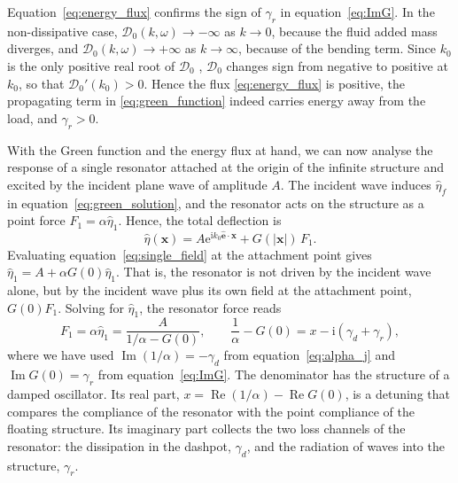 \begin{remark}
  Equation~\eqref{eq:energy_flux} confirms the sign of $\gamma_r$ in equation~\eqref{eq:ImG}. In the non-dissipative case, $\mathcal{D}_0(k,\omega)\to-\infty$ as $k\to0$, because the fluid added mass diverges, and $\mathcal{D}_0(k,\omega)\to+\infty$ as $k\to\infty$, because of the bending term. Since $k_0$ is the only positive real root of $\mathcal{D}_0$ \citep{fox1994oblique}, $\mathcal{D}_0$ changes sign from negative to positive at $k_0$, so that $\mathcal{D}_0'(k_0)>0$. Hence the flux \eqref{eq:energy_flux} is positive, the propagating term in \eqref{eq:green_function} indeed carries energy away from the load, and $\gamma_r>0$.
\end{remark}

With the Green function and the energy flux at hand, we can now analyse the response of a single resonator attached at the origin of the infinite structure and excited by the incident plane wave of amplitude $A$. The incident wave induces $\widehat{\eta}_f$ in equation~\eqref{eq:green_solution}, and the resonator acts on the structure as a point force $F_1=\alpha\widehat{\eta}_1$. Hence, the total deflection is
\begin{equation}
  \label{eq:single_field}
  \widehat{\eta}(\mathbf{x})=A\mathrm{e}^{\mathrm{i}k_0\hat{\mathbf{e}}\cdot\mathbf{x}}+G(|\mathbf{x}|)\,F_1 .
\end{equation}
Evaluating equation~\eqref{eq:single_field} at the attachment point gives $\widehat{\eta}_1=A+\alpha G(0)\widehat{\eta}_1$. That is, the resonator is not driven by the incident wave alone, but by the incident wave plus its own field at the attachment point, $G(0)F_1$. Solving for $\widehat{\eta}_1$, the resonator force reads
\begin{equation}
  \label{eq:single_force}
  F_1=\alpha\widehat{\eta}_1=\frac{A}{1/\alpha-G(0)},
  \qquad
  \frac{1}{\alpha}-G(0)=x-\mathrm{i}(\gamma_d+\gamma_r),
\end{equation}
where we have used $\operatorname{Im}(1/\alpha)=-\gamma_d$ from equation~\eqref{eq:alpha_j} and $\operatorname{Im}G(0)=\gamma_r$ from equation~\eqref{eq:ImG}. The denominator has the structure of a damped oscillator. Its real part, $x=\operatorname{Re}(1/\alpha)-\operatorname{Re}G(0)$, is a detuning that compares the compliance of the resonator with the point compliance of the floating structure. Its imaginary part collects the two loss channels of the resonator: the dissipation in the dashpot, $\gamma_d$, and the radiation of waves into the structure, $\gamma_r$.

